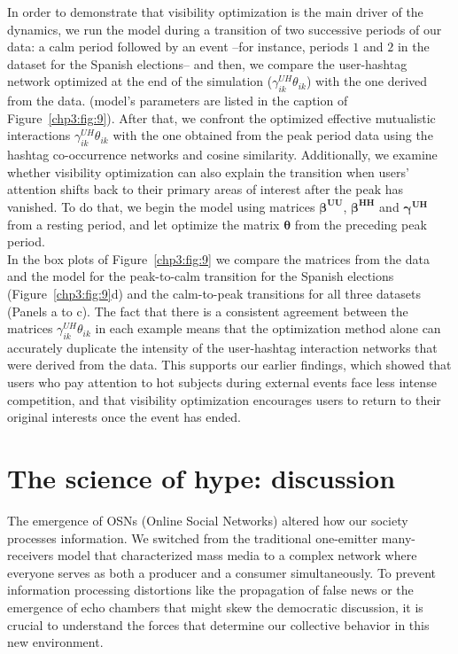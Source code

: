 In order to demonstrate that visibility optimization is the main driver of the dynamics, we run the model during a transition of two successive periods of our data: a calm period followed by an event --for instance, periods $1$ and $2$ in the dataset for the Spanish elections-- and then, we compare the user-hashtag network optimized at the end of the simulation ($\gamma_{ik}^{UH} \theta_{ik}$) with the one derived from the data.
 (model's parameters are listed in the caption of Figure~\ref{chp3:fig:9}). After that, we confront the optimized effective mutualistic interactions $\gamma^{UH}_{ik}\theta_{ik}$ with the one obtained from the peak period data using the hashtag co-occurrence networks and cosine similarity. Additionally, we examine whether visibility optimization can also explain the transition when users' attention shifts back to their primary areas of interest after the peak has vanished. To do that, we begin the model using matrices $\boldsymbol{\beta^{UU}}$,  $\boldsymbol{\beta^{HH}}$ and $\boldsymbol{\gamma^{UH}}$ from a resting period, and let optimize the matrix $\boldsymbol{\theta}$ from the preceding peak period. \\

In the box plots of Figure~\ref{chp3:fig:9} we compare the matrices from the data and the model for the peak-to-calm transition for the Spanish elections (Figure~\ref{chp3:fig:9}d) and the calm-to-peak transitions for all three datasets (Panels a to c). The fact that there is a consistent agreement between the matrices $\gamma_{ik}^{UH} \theta_{ik}$ in each example means that the optimization method alone can accurately duplicate the intensity of the user-hashtag interaction networks that were derived from the data. This supports our earlier findings, which showed that users who pay attention to hot subjects during external events face less intense competition, and that visibility optimization encourages users to return to their original interests once the event has ended.

\section{The science of hype: discussion}
\label{chp3:3}

The emergence of OSNs (Online Social Networks) altered how our society processes information. We switched from the traditional one-emitter many-receivers model that characterized mass media to a complex network where everyone serves as both a producer and a consumer simultaneously. To prevent information processing distortions like the propagation of false news or the emergence of echo chambers that might skew the democratic discussion, it is crucial to understand the forces that determine our collective behavior in this new environment.\\


